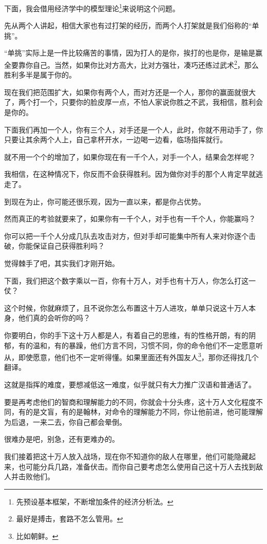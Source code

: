 \begin{multicols}{\theparacolNo}
下面，我会借用经济学中的模型理论\footnote{先预设基本框架，不断增加条件的经济分析法。}来说明这个问题。

先从两个人讲起，相信大家也有过打架的经历，而两个人打架就是我们俗称的“单挑”。

“单挑”实际上是一件比较痛苦的事情，因为打人的是你，挨打的也是你，是输是赢全要靠你自己。当然，如果你比对方高大，比对方强壮，凑巧还练过武术\footnote{最好是搏击，套路不怎么管用。}，那么胜利多半是属于你的。

现在我们把范围扩大，如果你有两个人，而对方还是一个人，那你的赢面就很大了，两个打一个，只要你的脸皮厚一点，不怕人家说你胜之不武，我相信，胜利会是你的。

下面我们再加一个人，你有三个人，对手还是一个人，此时，你就不用动手了，你只要让其余两个人上，自己拿杯开水，一边喝一边看，临场指挥就行。

就不用一个个的增加了，如果你现在有一千个人，对手一个人，结果会怎样呢？

我相信，在这种情况下，你反而不会获得胜利。因为做你对手的那个人肯定早就逃走了。

到现在为止，你可能还很乐观，因为一直以来，都是你占优势。

然而真正的考验就要来了，如果你有一千个人，对手也有一千个人，你能赢吗？

你可以把一千个人分成几队去攻击对方，但对手却可能集中所有人来对你逐个击破，你能保证自己获得胜利吗？

觉得棘手了吧，其实我们才刚开始。

下面，我们把这个数字乘以一百，你有十万人，对手也有十万人，你怎么打这一仗？

这个时候，你就麻烦了，且不说你怎么布置这十万人进攻，单单只说这十万人本身，他们真的会听你的吗？

你要明白，你的手下这十万人都是人，有着自己的思维，有的性格开朗，有的阴郁，有的温和，有的暴躁，他们方言不同，习惯不同，你的命令他们不一定愿意听从，即使愿意，他们也不一定听得懂。如果里面还有外国友人\footnote{比如朝鲜。}，那你还得找几个翻译。

这就是指挥的难度，要想减低这一难度，似乎就只有大力推广汉语和普通话了。

要是再考虑他们的智商和理解能力的不同，你就会十分头疼，这十万人文化程度不同，有的是文盲，有的是翰林，对命令的理解能力不同，你让他前进，他可能理解为后退，一来二去，你自己都会晕倒。

很难办是吧，别急，还有更难办的。

我们接着把这十万人放入战场，现在你不知道你的敌人在哪里，他们可能隐藏起来，也可能分兵几路，准备伏击。而你自己要考虑怎么使用自己这十万人去找到敌人并击败他们。


\end{multicols}
